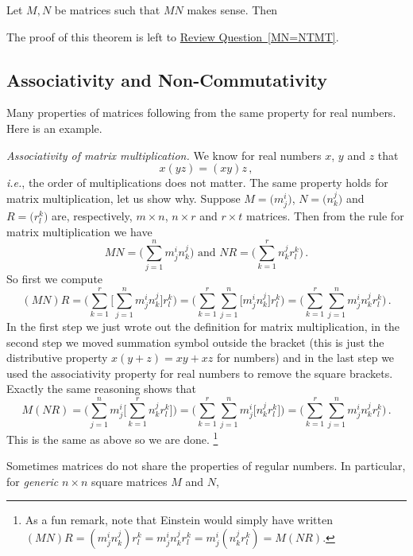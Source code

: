 \begin{theorem}
Let $M, N$ be matrices such that $MN$ makes sense.  Then 
\end{theorem}
The proof of this theorem is left to \hyperref[MN=NTMT]{Review Question~\ref*{MN=NTMT}}.

\subsection{Associativity and Non-Commutativity }

Many properties of matrices following from the same property for real numbers. Here is an example.

\begin{example}
{\itshape Associativity of matrix multiplication.} We know for real numbers $x$, $y$ and $z$ that 
\[
x(yz)=(xy)z\, ,
\]
{\itshape i.e.}, the order of multiplications does not matter. The same property holds for matrix multiplication, let us show why.
Suppose $M=\big( m^i_j \big)$, $N=\big( n^j_k \big)$ and  $R=\big( r^k_l \big)$ are, 
respectively, $m\times n$, $n\times r$ and $r\times t$ matrices. Then from the rule for matrix
multiplication we have
\[
MN=\Big(\sum_{j=1}^n m^i_j n^j_k\Big)\mbox{ and } NR=\Big(\sum_{k=1}^r n^j_k r^k_l\Big)\, .
\]
So first we compute 
\[
(MN)R=\Big(\sum_{k=1}^r \Big[\sum_{j=1}^n m^i_j n^j_k\Big] r^k_l \Big) = 
\Big(\sum_{k=1}^r \sum_{j=1}^n \Big[ m^i_j n^j_k\Big] r^k_l \Big) =\Big(\sum_{k=1}^r \sum_{j=1}^n m^i_j n^j_k r^k_l \Big)\, .
\]
In the first step we just wrote out the definition for matrix multiplication, in the second step we
moved summation symbol outside the bracket (this is just the distributive
property $x(y+z)=xy+xz$ for numbers) and
in the last step we used the associativity property for real numbers to remove the square brackets. 
Exactly the same reasoning shows that
\[
M(NR)=\Big(\sum_{j=1}^n m^i_j\Big[\sum_{k=1}^r n^j_k r^k_l\Big]\Big) = 
\Big(\sum_{k=1}^r \sum_{j=1}^n  m^i_j \Big[n^j_kr^k_l \Big] \Big) =\Big(\sum_{k=1}^r \sum_{j=1}^n m^i_j n^j_k r^k_l \Big)\, .
\]
This is the same as above so we are done. \footnote{As a fun remark, note that Einstein would simply have written\\
$(MN)R=(m^i_j n^j_k) r^k_l= m^i_j n^j_k r^k_l = m^i_j (n^j_k r^k_l ) = M(NR)$.}
\end{example}


Sometimes matrices do not share the properties of regular numbers. 
In particular, for {\itshape generic} $n\times n$ square matrices $M$ and $N$, 
\begin{center}
\end{center}

